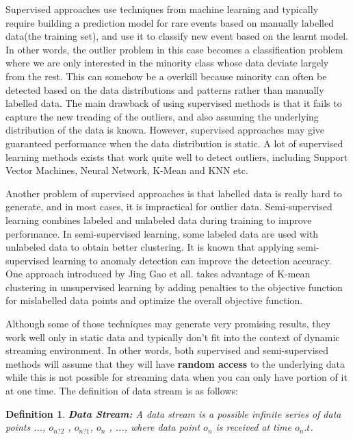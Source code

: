 \documentclass[11pt]{article}       %
\newtheorem{definition}{Definition}
\begin{document}
Supervised approaches use techniques from machine learning and typically require building a prediction model for rare events based on manually labelled data(the training set), and use it to classify new event based on the learnt model\cite{Joshi:2001:MNH:376284.375673,sup02}. In other words, the outlier problem in this case becomes a classification problem where we are only interested in the minority class whose data deviate largely from the rest. This can somehow be a overkill because minority can often be detected based on the data distributions and patterns rather than manually labelled data. The main drawback of using supervised methods is that it fails to capture the new treading of the outliers, and also assuming the underlying distribution of the data is known. However, supervised approaches may give guaranteed performance when the data distribution is static. A lot of supervised learning methods exists that work quite well to detect outliers, including Support Vector Machines, Neural Network, K-Mean and KNN etc. 

Another problem of supervised approaches is that labelled data is really hard to generate, and in most cases, it is impractical for outlier data. Semi-supervised learning\cite{Basu:2004:PFS:1014052.1014062,semi-sup02} combines labeled and unlabeled data during training to improve performance. In semi-supervised learning, some labeled data are used with unlabeled data to obtain better clustering. It is known that applying semi-supervised learning to anomaly detection can improve the detection accuracy\cite{Yu2009}. One approach introduced by Jing Gao et all.\cite{Gao:2006:SOD:1141277.1141421} takes advantage of K-mean clustering in unsupervised learning by adding penalties to the objective function for mislabelled data points and optimize the overall objective function. 

Although some of those techniques may generate very promising results, they work well only in static data and typically don't fit into the context of dynamic streaming environment. In other words, both supervised and semi-supervised methods will assume that they will have \textbf{random access} to the underlying data while this is not possible for streaming data when you can only have portion of it at one time. The definition of data stream is as follows:

\begin{definition}
\textbf{Data Stream:} A data stream is a possible infinite series of data points ..., $o_{n?2}$ , $o_{n?1}$, $o_{n}$ , ..., where data point $o_{n}$ is received at time $o_{n}.t$.
\end{definition}
\end{document}
